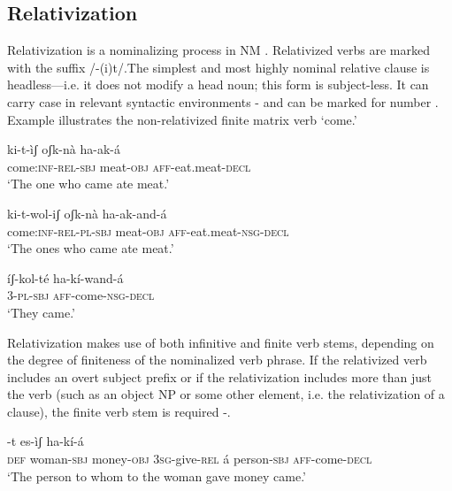 \documentclass[output=paper]{langsci/langscibook}
\begin{document}
\subsection{Relativization}\label{sec:mahland:2.2}

Relativization is a nominalizing process in NM \citep[225]{Ahland2012}. Relativized verbs are marked with the suffix /-(i)t/.The simplest and most highly nominal relative clause is headless—i.e. it does not modify a head noun; this form is subject-less. It can carry case in relevant syntactic environments - and can be marked for number . Example  illustrates the non-relativized finite matrix verb `come.' 

\ea\label{ex:mahland:40}
\gll ki-t-ìʃ                    oʃk-nà      ha-ak-á  \\
come:\textsc{inf-rel-sbj}   meat-\textsc{obj}   \textsc{aff}-eat.meat-\textsc{decl}\\
\glt `The one who came ate meat.'
\z

\ea\label{ex:mahland:41}
\gll ki-t-wol-iʃ           oʃk-nà       ha-ak-and-á\\
come:\textsc{inf-rel-pl-sbj}   meat-\textsc{obj}   \textsc{aff}-eat.meat-\textsc{nsg-decl} \\
\glt `The ones who came ate meat.' 
\z

\ea\label{ex:mahland:42}
\gll íʃ-kol-té    ha-kí-wand-á \\
\textsc{3-pl-sbj   aff}{}-come-\textsc{nsg-decl} \\
\glt `They came.'
\z

Relativization makes use of both infinitive and finite verb stems, depending on the degree of finiteness of the nominalized verb phrase. If the relativized verb includes an overt subject prefix or if the relativization includes more than just the verb (such as an object NP or some other element, i.e. the relativization of a clause), the finite verb stem is required -. 


\ea\label{ex:mahland:43}
-t  es-ìʃ           ha-kí-{\downstep}á
\\
\textsc{def}     woman\textsc{{}-sbj}   money\textsc{{}-obj}   \textsc{3sg}{}-give\textsc{{}-rel}  á person\textsc{{}-sbj}   \textsc{aff}{}-come-\textsc{decl} \\
\glt `The person to whom to the woman gave money came.'
\z
\end{document}
